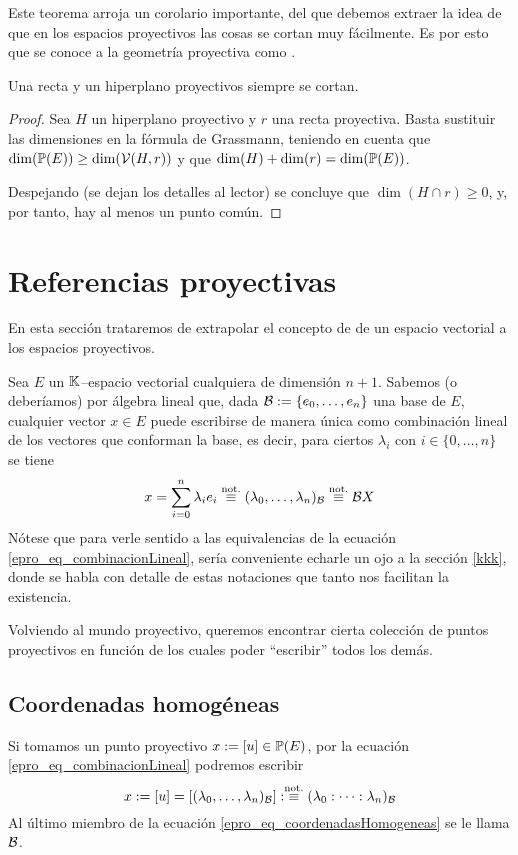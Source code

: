Este teorema arroja un corolario importante, del que debemos extraer la idea de que en los espacios proyectivos las cosas se cortan muy fácilmente. Es por esto que se conoce a la geometría proyectiva como .
\begin{cor}
	Una recta y un hiperplano proyectivos siempre se cortan.
\end{cor}
\begin{proof}
	Sea $H$ un hiperplano proyectivo y $r$ una recta proyectiva. Basta sustituir las dimensiones en la fórmula de Grassmann, teniendo en cuenta que $\dim(\mathbb{P}(E))\geq\dim(\mathcal{V}(H,r))$ y que $\dim(H)+\dim(r)=\dim(\mathbb{P}(E))$.
	
	Despejando (se dejan los detalles al lector) se concluye que $\dim(H\cap r)\geq 0$, y, por tanto, hay al menos un punto común.
\end{proof}
\section{Referencias proyectivas}
En esta sección trataremos de extrapolar el concepto de  de un espacio vectorial a los espacios proyectivos.

Sea $E$ un $\mathbb{K}$--espacio vectorial cualquiera de dimensión $n+1$. Sabemos (o deberíamos) por álgebra lineal que, dada $\mathcal{B}:=\{e_0,\dots,e_n\}$ una base de $E$, cualquier vector $x\in E$ puede escribirse de manera única como combinación lineal de los vectores que conforman la base, es decir, para ciertos $\lambda_i$ con $i\in\{0,\dots,n\}$ se tiene
\begin{equation}
\label{epro_eq_combinacionLineal}
x=\sum_{i=0}^{n}\lambda_ie_i\stackrel{\textrm{not.}}{\equiv}(\lambda_0,\dots,\lambda_n)_{\mathcal{B}}\stackrel{\textrm{not.}}{\equiv}\mathcal{B}X
\end{equation}
Nótese que para verle sentido a las equivalencias de la ecuación \eqref{epro_eq_combinacionLineal}, sería conveniente echarle un ojo a la sección \ref{kkk}, donde se habla con detalle de estas notaciones que tanto nos facilitan la existencia.

Volviendo al mundo proyectivo, queremos encontrar cierta colección de puntos proyectivos en función de los cuales poder ``escribir'' todos los demás. 
\subsection{Coordenadas homogéneas}
\label{epro_coordenadasHomogeneas}
Si tomamos un punto proyectivo $x:=\left [ u \right ]\in\mathbb{P}(E)$, por la ecuación \eqref{epro_eq_combinacionLineal} podremos escribir
\begin{equation}
	\label{epro_eq_coordenadasHomogeneas}
	x:=\left [ u \right ]=\left [ (\lambda_0,\dots,\lambda_n)_{\mathcal{B}} \right ]:\stackrel{\textrm{not.}}{\equiv}(\lambda_0:\dots:\lambda_n)_{\mathcal{B}}
\end{equation}
Al último miembro de la ecuación \eqref{epro_eq_coordenadasHomogeneas} se le llama    $\mathcal{B}$.

